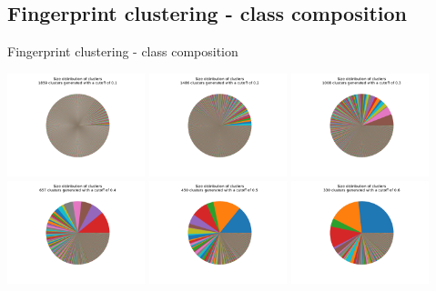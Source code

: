 \documentclass{beamer}
\begin{document}
\subsection{Fingerprint clustering - class composition}
\begin{frame}{Fingerprint clustering - class composition}

\includegraphics[width=0.3\textwidth]{../outputs/fingerprint_clusters_0.1.pdf}
\includegraphics[width=0.3\textwidth]{../outputs/fingerprint_clusters_0.2.pdf}
\includegraphics[width=0.3\textwidth]{../outputs/fingerprint_clusters_0.3.pdf}
\includegraphics[width=0.3\textwidth]{../outputs/fingerprint_clusters_0.4.pdf}
\includegraphics[width=0.3\textwidth]{../outputs/fingerprint_clusters_0.5.pdf}
\includegraphics[width=0.3\textwidth]{../outputs/fingerprint_clusters_0.6.pdf}

\end{frame}
\end{document}
